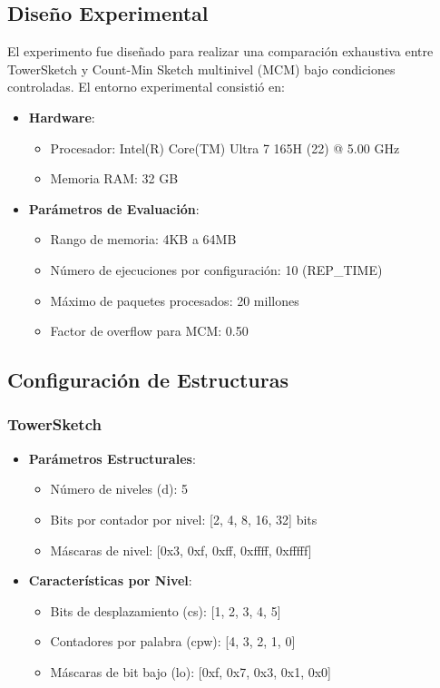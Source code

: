 \documentclass[a4paper,12pt]{article}
\begin{document}
\subsection{Diseño Experimental}
El experimento fue diseñado para realizar una comparación exhaustiva entre TowerSketch y Count-Min Sketch multinivel (MCM) bajo condiciones controladas. El entorno experimental consistió en:

\begin{itemize}
    \item \textbf{Hardware}:
    \begin{itemize}
        \item Procesador: Intel(R) Core(TM) Ultra 7 165H (22) @ 5.00 GHz
        \item Memoria RAM: 32 GB
    \end{itemize}
    
    \item \textbf{Parámetros de Evaluación}:
    \begin{itemize}
        \item Rango de memoria: 4KB a 64MB
        \item Número de ejecuciones por configuración: 10 (REP\_TIME)
        \item Máximo de paquetes procesados: 20 millones
        \item Factor de overflow para MCM: 0.50
    \end{itemize}
\end{itemize}

\subsection{Configuración de Estructuras}
\subsubsection{TowerSketch}
\begin{itemize}
    \item \textbf{Parámetros Estructurales}:
    \begin{itemize}
        \item Número de niveles (d): 5
        \item Bits por contador por nivel: [2, 4, 8, 16, 32] bits
        \item Máscaras de nivel: [0x3, 0xf, 0xff, 0xffff, 0xfffff]
    \end{itemize}
    
    \item \textbf{Características por Nivel}:
    \begin{itemize}
        \item Bits de desplazamiento (cs): [1, 2, 3, 4, 5]
        \item Contadores por palabra (cpw): [4, 3, 2, 1, 0]
        \item Máscaras de bit bajo (lo): [0xf, 0x7, 0x3, 0x1, 0x0]
    \end{itemize}
\end{itemize}
\end{document}
